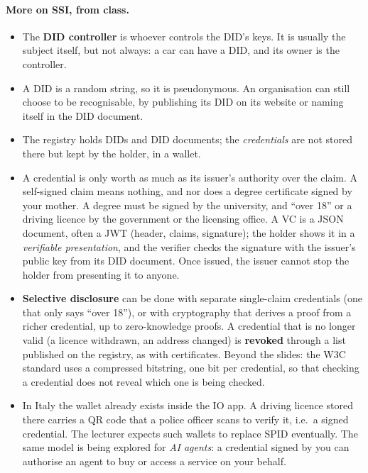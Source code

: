 \paragraph{More on SSI, from class.}
\begin{itemize}
    \item The \textbf{DID controller} is whoever controls the DID's keys. It is usually the subject itself, but not always: a car can have a DID, and its owner is the controller.
    \item A DID is a random string, so it is pseudonymous. An organisation can still choose to be recognisable, by publishing its DID on its website or naming itself in the DID document.
    \item The registry holds DIDs and DID documents; the \emph{credentials} are not stored there but kept by the holder, in a wallet.
    \item A credential is only worth as much as its issuer's authority over the claim. A self-signed claim means nothing, and nor does a degree certificate signed by your mother. A degree must be signed by the university, and \enquote{over 18} or a driving licence by the government or the licensing office. A VC is a JSON document, often a JWT (header, claims, signature); the holder shows it in a \emph{verifiable presentation}, and the verifier checks the signature with the issuer's public key from its DID document. Once issued, the issuer cannot stop the holder from presenting it to anyone.
    \item \textbf{Selective disclosure} can be done with separate single-claim credentials (one that only says \enquote{over 18}), or with cryptography that derives a proof from a richer credential, up to zero-knowledge proofs. A credential that is no longer valid (a licence withdrawn, an address changed) is \textbf{revoked} through a list published on the registry, as with certificates. Beyond the slides: the W3C standard uses a compressed bitstring, one bit per credential, so that checking a credential does not reveal which one is being checked.
    \item In Italy the wallet already exists inside the IO app. A driving licence stored there carries a QR code that a police officer scans to verify it, i.e.\ a signed credential. The lecturer expects such wallets to replace SPID eventually. The same model is being explored for \emph{AI agents}: a credential signed by you can authorise an agent to buy or access a service on your behalf.
\end{itemize}


